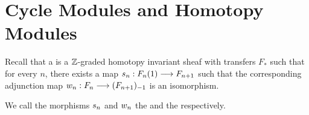 \newpage
\section{Cycle Modules and Homotopy Modules}\label{sect_cycmod_and_hm}

\begin{defn}\label{def_hm}
Recall that a  is a $\mathbb{Z}$-graded homotopy 
invariant sheaf with transfers $F_*$ such that for every $n$, 
there exists a map $s_n: F_n(1) \longrightarrow F_{n+1}$ such that the 
corresponding adjunction map $w_n: F_n \longrightarrow (F_{n+1})_{-1}$
is an isomorphism.

We call the morphisms $s_n$ and $w_n$ the  and the  respectively.
\end{defn}
